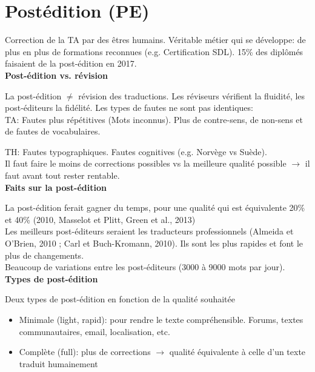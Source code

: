 \section{Postédition (PE)}

Correction de la TA par des êtres humains. Véritable métier qui se développe: de plus en plus de formations reconnues (e.g. Certification SDL). 15\% des diplômés faisaient de la post-édition en 2017.\\

\textbf{Post-édition vs. révision}

La post-édition $\neq$ révision des traductions. Les réviseurs vérifient la fluidité, les post-éditeurs la fidélité. Les types de fautes ne sont pas identiques:\\

TA: Fautes plus répétitives (Mots inconnus). Plus de contre-sens, de non-sens et de fautes de vocabulaires.

TH: Fautes typographiques. Fautes cognitives (e.g. Norvège vs Suède).\\

Il faut faire le moins de corrections possibles vs la meilleure qualité possible $\rightarrow$ il faut avant tout rester rentable.\\

\textbf{Faits sur la post-édition}

La post-édition ferait gagner du temps, pour une qualité qui est équivalente
20\% et 40\% (2010, Masselot et Plitt, Green et al., 2013)\\

Les meilleurs post-éditeurs seraient les traducteurs professionnels (Almeida et O’Brien, 2010 ; Carl et Buch-Kromann, 2010). Ils sont les plus rapides et font le plus de changements.\\

Beaucoup de variations entre les post-éditeurs (3000 à 9000 mots par jour).\\

\textbf{Types de post-édition}

Deux types de post-édition en fonction de la qualité souhaitée

\begin{itemize}
    \item Minimale (light, rapid): pour rendre le texte compréhensible. Forums, textes communautaires, email, localisation, etc.
    \item Complète (full): plus de corrections $\rightarrow$ qualité équivalente à celle d’un texte traduit humainement\\
\end{itemize}

